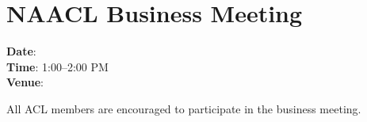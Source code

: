 \section[NAACL Business Meeting]{NAACL Business Meeting}
\thispagestyle{emptyheader}

\textbf{Date}: \daydateyear \\
\textbf{Time}: 1:00--2:00 PM \\
\textbf{Venue}: \BusinessMeetingLoc

All ACL members are encouraged to participate in the business
meeting. 

